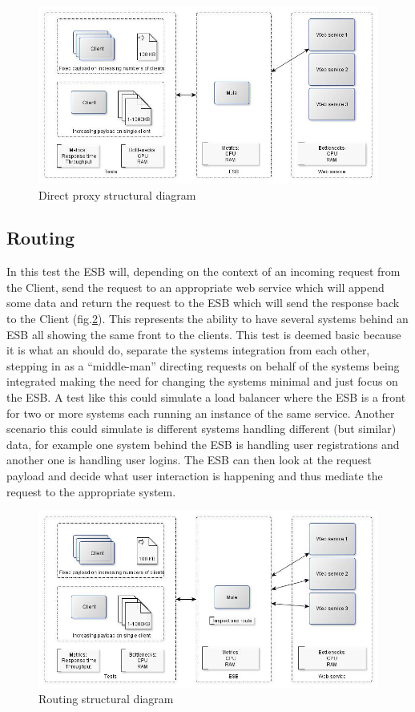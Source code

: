 \begin{figure}[H]
	\centerline{\includegraphics[scale=0.43]{img/direct_proxy}}
	\caption{Direct proxy structural diagram}
	\label{fig:proxy-diagram}
\end{figure}

\subsection{Routing}
In this test the ESB will, depending on the context of an incoming request from the Client, send the request to an appropriate web service which will append some data and return the request to the ESB which will send the response back to the Client (fig.\ref{fig:routing-diagram}).
This represents the ability to have several systems behind an ESB all showing the same front to the clients.
This test is deemed basic because it is what an should do, separate the systems integration from each other, stepping in as a ``middle-man'' directing requests on behalf of the systems being integrated making the need for changing the systems minimal and just focus on the ESB. 
A test like this could simulate a load balancer where the ESB is a front for two or more systems each running an instance of the same service. Another scenario this could simulate is different systems handling different (but similar) data, for example one system behind the ESB is handling user registrations and another one is handling user logins. The ESB can then look at the request payload and decide what user interaction is happening and thus mediate the request to the appropriate system.

\begin{figure}[H]
	\centerline{\includegraphics[scale=0.43]{img/Routing}}
	\caption{Routing structural diagram}
	\label{fig:routing-diagram}
\end{figure}


